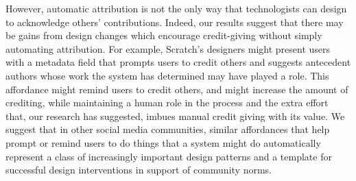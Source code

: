 However, automatic attribution is not the only way that technologists
can design to acknowledge others' contributions. Indeed, our results
suggest that there may be gains from design changes which encourage
credit-giving without simply automating attribution. For example,
Scratch's designers might present users with a metadata field that
prompts users to credit others and suggests antecedent authors whose
work the system has determined may have played a role. This affordance
might remind users to credit others, and might increase the amount of
crediting, while maintaining a human role in the process and the extra
effort that, our research has suggested, imbues manual credit giving
with its value. We suggest that in other social media communities,
similar affordances that help prompt or remind users to do things that
a system might do automatically represent a class of increasingly
important design patterns and a template for successful design
interventions in support of community norms.


